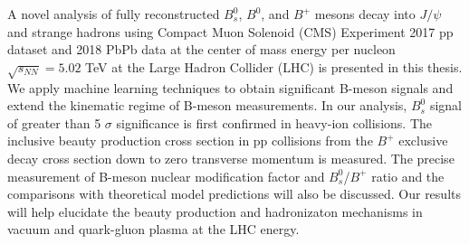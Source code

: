 % 
% 
%
A novel analysis of fully reconstructed $B^0_s$, $B^0$, and $B^+$ mesons decay into $J/\psi$ and strange hadrons using Compact Muon Solenoid (CMS) Experiment 2017 pp dataset and 2018 PbPb data at the center of mass energy per nucleon $\sqrt{s_{NN}} = 5.02$ TeV at the Large Hadron Collider (LHC) is presented in this thesis. We apply machine learning techniques to obtain significant B-meson signals and extend the kinematic regime of B-meson measurements. In our analysis, $B^0_s$ signal of greater than 5 $\sigma$ significance is first confirmed in heavy-ion collisions. The inclusive beauty production cross section in pp collisions from the $B^+$ exclusive decay cross section down to zero transverse momentum is measured. The precise measurement of B-meson nuclear modification factor and $B^0_s$/$B^+$ ratio and the comparisons with theoretical model predictions will also be discussed. Our results will help elucidate the beauty production and hadronizaton mechanisms in vacuum and quark-gluon plasma at the LHC energy. 